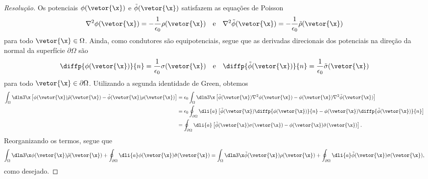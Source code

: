 \begin{proof}[Resolução]
    Os potenciais \(\phi(\vetor{\x})\) e \(\tilde{\phi}(\vetor{\x})\) satisfazem as equações de Poisson
    \begin{equation*}
        \nabla^2 \phi(\vetor{\x}) =-\frac{1}{\epsilon_0}\rho(\vetor{\x})
        \quad\text{e}\quad
        \nabla^2 \tilde{\phi}(\vetor{\x}) =-\frac{1}{\epsilon_0}\tilde{\rho}(\vetor{\x})
    \end{equation*}
    para todo \(\vetor{\x} \in \Omega\). Ainda, como condutores são equipotenciais, segue que as derivadas direcionais dos potenciais na direção da normal da superfície \(\partial \Omega\) são
    \begin{equation*}
        \diffp{\phi(\vetor{\x})}{n} = \frac{1}{\epsilon_0}\sigma(\vetor{\x})
        \quad\text{e}\quad
        \diffp{\tilde{\phi}(\vetor{\x})}{n} = \frac{1}{\epsilon_0}\tilde{\sigma}(\vetor{\x})
    \end{equation*}
    para todo \(\vetor{\x} \in \partial \Omega\). Utilizando a segunda identidade de Green, obtemos
    \begin{align*}
        \int_{\Omega} \dln3\x \left[\phi(\vetor{\x})\tilde{\rho}(\vetor{\x}) - \tilde{\phi}(\vetor{\x})\rho(\vetor{\x})\right]
        &= \epsilon_0\int_{\Omega} \dln3\x \left[\tilde{\phi}(\vetor{\x})\nabla^2\phi(\vetor{\x})-\phi(\vetor{\x})\nabla^2\tilde{\phi}(\vetor{\x})\right]\\
        &= \epsilon_0 \oint_{\partial \Omega}\dli{a} \left[\tilde{\phi}(\vetor{\x})\diffp{\phi(\vetor{\x})}{n} - \phi(\vetor{\x}) \diffp{\tilde{\phi}(\vetor{\x})}{n} \right]\\
        &= \oint_{\partial \Omega} \dli{a} \left[\tilde{\phi}(\vetor{\x}) \sigma(\vetor{\x}) - \phi(\vetor{\x}) \tilde{\sigma}(\vetor{\x})\right].
    \end{align*}
    Reorganizando os termos, segue que
    \begin{equation*}
        \int_{\Omega}\dln3\x \phi(\vetor{\x}) \tilde{\rho}(\vetor{\x}) + \oint_{\partial \Omega}\dli{a} \phi(\vetor{\x})\tilde{\sigma}(\vetor{\x}) = \int_{\Omega}\dln3\x \tilde{\phi}(\vetor{\x})\rho(\vetor{\x}) + \oint_{\partial \Omega} \dli{a} \tilde{\phi}(\vetor{\x})\sigma(\vetor{\x}),
    \end{equation*}
    como desejado.
\end{proof}

